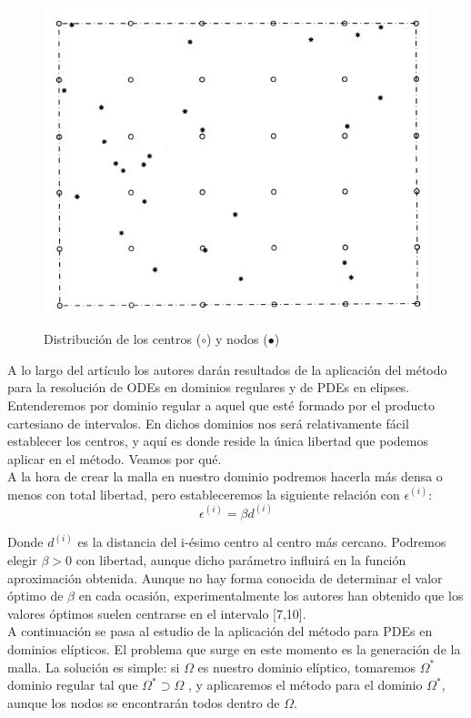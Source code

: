 \documentclass[12pt]{article}       %
\begin{document}
\begin{figure}
\centering
\includegraphics[scale=0.45]{img/centros}
\label{figura1}
\caption{Distribución de los centros ($\circ$) y nodos ($\bullet$)} 
\end{figure}

A lo largo del artículo los autores darán resultados de la aplicación del método para la resolución de ODEs en dominios regulares y de PDEs en elipses. Entenderemos por dominio regular a aquel que esté formado por el producto cartesiano de intervalos. En dichos dominios nos será relativamente fácil establecer los centros, y aquí es donde reside la única libertad que podemos aplicar en el método. Veamos por qué.\\

A la hora de crear la malla en nuestro dominio podremos hacerla más densa o menos con total libertad, pero estableceremos la siguiente relación con $\epsilon^{(i)}$:
$$\epsilon^{(i)} = \beta d^{(i)}$$

Donde $d^{(i)}$ es la distancia del i-ésimo centro al centro más cercano. Podremos elegir $\beta > 0$ con libertad, aunque dicho parámetro influirá en la función aproximación obtenida. Aunque no hay forma conocida de determinar el valor óptimo de $\beta$ en cada ocasión, experimentalmente los autores han obtenido que los valores óptimos suelen centrarse en el intervalo [7,10].\\

A continuación se pasa al estudio de la aplicación del método para PDEs en dominios elípticos. El problema que surge en este momento es la generación de la malla. La solución es simple: si $\Omega$ es nuestro dominio elíptico, tomaremos $\Omega^*$ dominio regular tal que $\Omega^*\supset \Omega$ , y aplicaremos el método para el dominio $\Omega^*$, aunque los nodos se encontrarán todos dentro de $\Omega$.\\
\end{document}
